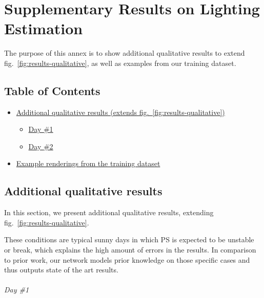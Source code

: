 \chapter{Supplementary Results on Lighting Estimation}     %
\label{annex3}

\graphicspath{{annex3_figures/}}

The purpose of this annex is to show additional qualitative results
to extend fig.~\ref{fig:results-qualitative}, as well as examples from our training dataset.

\hypertarget{an3-table-of-contents}{%
\section*{Table of Contents}\label{an3-table-of-contents}}

\begin{itemize}
\item\hyperlink{extraresults}{Additional qualitative results (extends
fig.~\ref{fig:results-qualitative})}
\begin{itemize}
\tightlist
\item
  \protect\hyperlink{extraresultsd2}{Day \#1}
\item
  \protect\hyperlink{extraresultsd2}{Day \#2}
\end{itemize}
\item\hyperlink{trainingrenders}{Example renderings from the training
dataset}
\end{itemize}

\protect\hypertarget{extraresults}{}{}

\hypertarget{additional-qualitative-results}{%
\section{Additional qualitative
results}\label{additional-qualitative-results}}

In this section, we present additional qualitative results, extending
fig.~\ref{fig:results-qualitative}.

These conditions are typical sunny days in which PS is expected to be
unstable or break, which explains the high amount of errors in the
results. In comparison to prior work, our network models prior knowledge
on those specific cases and thus outputs state of the art results.

\clearpage

\hypertarget{day-1}{%
\subparagraph{Day \#1}\label{day-1}}


